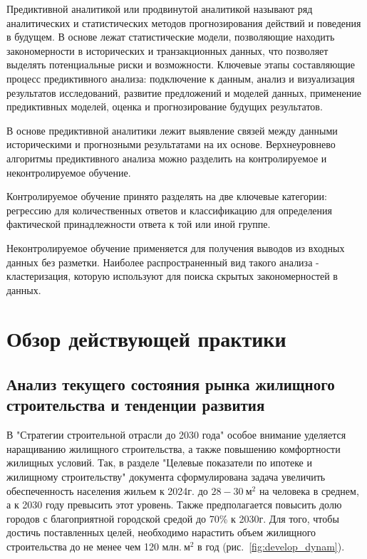 \documentclass[12pt,a4paper]{article} %
\begin{document}
Предиктивной аналитикой или продвинутой аналитикой называют ряд аналитических и статистических методов прогнозирования действий и поведения в будущем. В основе лежат статистические модели, позволяющие находить закономерности в исторических и транзакционных данных, что позволяет выделять потенциальные риски и возможности. Ключевые этапы составляющие процесс предиктивного анализа: подключение к данным, анализ и визуализация результатов исследований, развитие предложений и моделей данных, применение предиктивных моделей, оценка и прогнозирование будущих результатов.

В основе предиктивной аналитики лежит выявление связей между данными историческими и прогнозными результатами на их основе. Верхнеуровнево алгоритмы предиктивного анализа можно разделить на контролируемое и неконтролируемое обучение.

Контролируемое обучение принято разделять на две ключевые категории: регрессию для количественных ответов и классификацию для определения фактической принадлежности ответа к той или иной группе. 
 
Неконтролируемое обучение применяется для получения выводов из входных данных без разметки. Наиболее распространенный вид такого анализа - кластеризация, которую используют для поиска скрытых закономерностей в данных.


\newpage
\section{Обзор действующей практики}
\subsection{Анализ текущего состояния рынка жилищного строительства и тенденции развития}

В "Стратегии строительной отрасли до 2030 года" особое внимание уделяется наращиванию жилищного строительства, а также повышению комфортности жилищных условий. Так, в разделе "Целевые показатели по ипотеке и жилищному строительству" документа сформулирована задача увеличить обеспеченность населения жильем к 2024г. до $28-30~\text{м}^2$ на человека в среднем, а к 2030 году превысить этот уровень. Также предполагается повысить долю городов с благоприятной городской средой до 70\% к 2030г. Для того, чтобы достичь поставленных целей, необходимо нарастить объем жилищного строительства до не менее чем 120 млн.$~\text{м}^2$ в год (рис.~\ref{fig:develop_dynam}).
\end{document}
